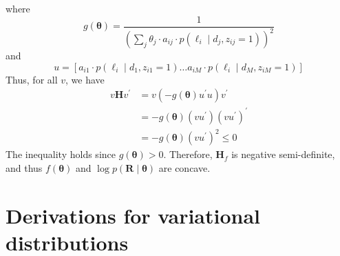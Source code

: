 where 
\begin{equation}
    g(\boldsymbol{\theta})=\frac{1}{\left(\sum_{j} \theta_{j} \cdot a_{i j} \cdot p\left(\ell_{i} \mid d_{j}, z_{i j}=1\right)\right)^{2}}
\end{equation}
and 
\begin{equation}
    u=\left[a_{i 1} \cdot p\left(\ell_{i} \mid d_{1}, z_{i 1}=1\right) \ldots a_{i M} \cdot p\left(\ell_{i} \mid d_{M}, z_{i M}=1\right)\right]
\end{equation}
Thus, for all $v$, we have 
\begin{equation}
    \begin{split}
        v \mathbf{H} v^{\prime} &=v\left(-g(\boldsymbol{\theta}) u^{\prime} u\right) v^{\prime} \\
        &=-g(\boldsymbol{\theta})\left(v u^{\prime}\right)\left(v u^{\prime}\right)^{\prime} \\
        &=-g(\boldsymbol{\theta})\left(v u^{\prime}\right)^{2} \leq 0
    \end{split}
\end{equation}
The inequality holds since $g(\bm\theta)>0$. Therefore, $\mathrm{\mathbf{H}}_f$ is negative semi-definite, and thus $f(\bm\theta)$ and $\log p(\bm{R}\mid\bm\theta)$ are concave.  

\chapter{Derivations for variational distributions}\label{sec:variational-dist}

